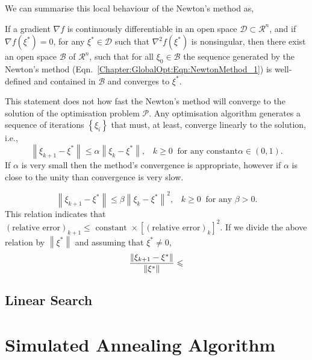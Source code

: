We can summarise this local behaviour of the Newton's method as,
\begin{shaded}
If a gradient $\nabla f$ is continuously differentiable in an open space $\mathcal{D}\subset\mathcal{R}^{n}$, and if $\nabla f\left(\xi^{\ast}\right)=0$, for any $\xi^{\ast}\in\mathcal{D}$ such that $\nabla^{2} f\left(\xi^{\ast}\right)$ is nonsingular, then there exist an open space $\mathcal{B}$ of $\mathcal{R}^{n}$, such that for all $\xi_{0}\in\mathcal{B}$ the sequence generated by the Newton's method (Eqn.~\ref{Chapter:GlobalOpt:Eqn:NewtonMethod_1}) is well-defined and contained in $\mathcal{B}$ and converges to $\xi^{\ast}$.
\end{shaded}

This statement does not how fast the Newton's method will converge to the solution of the optimisation problem $\mathcal{P}$. Any optimisation algorithm generates a sequence of iterations $\left\{\xi_{i}\right\}$ that must, at least, converge linearly to the solution, i.e.,
\begin{equation}
   \left\|\xi_{k+1}-\xi^{\ast}\right\| \le \alpha \left\|\xi_{k}-\xi^{\ast}\right\|,\;\;\; k\ge 0\;\;\text{for any constant} \alpha\in\left(0,1\right). 
\end{equation}
If $\alpha$ is very small then the method's convergence is appropriate, however if $\alpha$ is close to the unity than convergence is very slow. 


 
\begin{equation}
   \left\|\xi_{k+1}-\xi^{\ast}\right\| \le \beta \left\|\xi_{k}-\xi^{\ast}\right\|^{2},\;\;\; k\ge 0\;\;\text{for any } \beta >0. 
\end{equation}
This relation indicates that $\left(\text{relative error}\right)_{k+1} \le \text{ constant }\times\left[\left(\text{relative error}\right)_{k}\right]^{2}$. If we divide the above relation by $\left\|\xi^{\ast}\right\|$ and assuming that $\xi^{\ast}\ne 0$,
\begin{equation}
   \displaystyle\frac{\left\|\xi_{k+1}-\xi^{\ast}\right\|}{\left\|\xi^{\ast}\right\|} \leqslant 
\end{equation}

\subsection{Linear Search}\label{Chapter:GlobalOpt:Section:NewtonMethods:LinearSearch}


\clearpage
\section{Simulated Annealing Algorithm}\label{Chapter:GlobalOpt:Section:SimulatedAnnealing}

